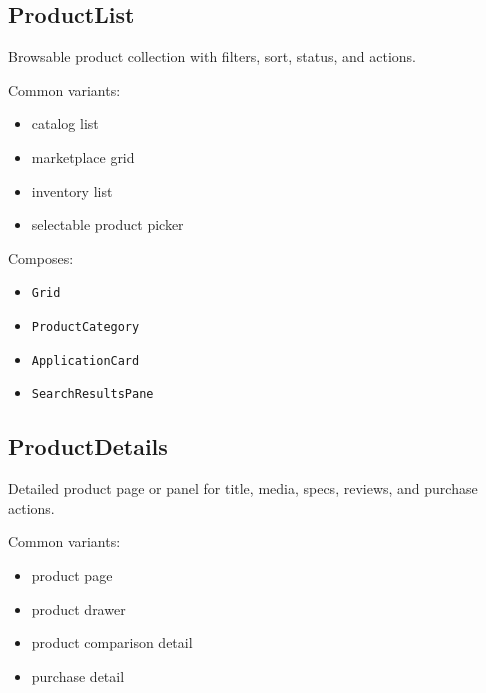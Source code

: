 \subsection{ProductList}\label{record-128-productlist}

Browsable product collection with filters, sort, status, and actions.

Common variants:

\begin{itemize}
\tightlist
\item
  catalog list
\item
  marketplace grid
\item
  inventory list
\item
  selectable product picker
\end{itemize}

Composes:

\begin{itemize}
\tightlist
\item
  \texttt{G\allowbreak{}r\allowbreak{}i\allowbreak{}d}
\item
  \texttt{P\allowbreak{}r\allowbreak{}o\allowbreak{}d\allowbreak{}u\allowbreak{}c\allowbreak{}t\allowbreak{}C\allowbreak{}a\allowbreak{}t\allowbreak{}e\allowbreak{}g\allowbreak{}o\allowbreak{}r\allowbreak{}y}
\item
  \texttt{A\allowbreak{}p\allowbreak{}p\allowbreak{}l\allowbreak{}i\allowbreak{}c\allowbreak{}a\allowbreak{}t\allowbreak{}i\allowbreak{}o\allowbreak{}n\allowbreak{}C\allowbreak{}a\allowbreak{}r\allowbreak{}d}
\item
  \texttt{S\allowbreak{}e\allowbreak{}a\allowbreak{}r\allowbreak{}c\allowbreak{}h\allowbreak{}R\allowbreak{}e\allowbreak{}s\allowbreak{}u\allowbreak{}l\allowbreak{}t\allowbreak{}s\allowbreak{}P\allowbreak{}a\allowbreak{}n\allowbreak{}e}
\end{itemize}

\subsection{ProductDetails}\label{record-128-productdetails}

Detailed product page or panel for title, media, specs, reviews, and purchase actions.

Common variants:

\begin{itemize}
\tightlist
\item
  product page
\item
  product drawer
\item
  product comparison detail
\item
  purchase detail
\end{itemize}


